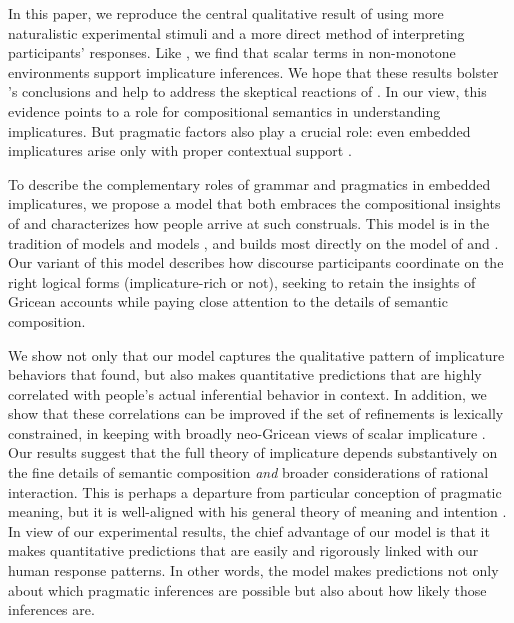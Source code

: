 \documentclass[leqno,12pt]{article}
\begin{document}
In this paper, we reproduce the central qualitative result of
\citet{Chemla:Spector:2011} using more naturalistic experimental
stimuli and a more direct method of interpreting participants'
responses. Like \citeauthor{Chemla:Spector:2011}, we find that scalar
terms in non-monotone environments support implicature inferences. We
hope that these results bolster \citeauthor{Chemla:Spector:2011}'s
conclusions and help to address the skeptical reactions of
\citet{geurts-vantiel:2013:scalar}. In our view, this evidence points
to a role for compositional semantics in understanding
implicatures. But pragmatic factors also play a crucial role: even
embedded implicatures arise only with proper contextual support
\citep{Russell06,ChierchiaFoxSpector08,Geurts:2011,Chemla:Spector:2011}.

To describe the complementary roles of grammar and pragmatics in
embedded implicatures, we propose a model that both embraces the
compositional insights of \citeauthor{ChierchiaFoxSpector08} and
characterizes how people arrive at such construals. This model is in
the tradition of  models
\citep{Frank:Goodman:2012,Goodman:Stuhlmuller:2013} and  models \citep{Franke09DISS,Jaeger:2011}, and builds
most directly on the  model of
\citet{Bergen:Goodman:Levy:2012} and
\citet{Bergen:Levy:Goodman:2014}. Our variant of this model describes
how discourse participants coordinate on the right logical forms
(implicature-rich or not), seeking to retain the insights of Gricean
accounts while paying close attention to the details of semantic
composition.

We show not only that our model captures the qualitative pattern of
implicature behaviors that \citeauthor{Chemla:Spector:2011} found, but
also makes quantitative predictions that are highly correlated with
people's actual inferential behavior in context. In addition, we show
that these correlations can be improved if the set of refinements is
lexically constrained, in keeping with broadly neo-Gricean views of
scalar implicature
\citep{Horn72,Gazdar79b,Gazdar79a,SchulzVanRooij06}.  Our results
suggest that the full theory of implicature depends substantively on
the fine details of semantic composition \emph{and} broader
considerations of rational interaction. This is perhaps a departure
from  particular conception of pragmatic meaning,
but it is well-aligned with his general theory of meaning and
intention \citep{grice57}.  In view of our experimental results, the
chief advantage of our model is that it makes quantitative predictions
that are easily and rigorously linked with our human response
patterns. In other words, the model makes predictions not only about
which pragmatic inferences are possible but also about how likely
those inferences are.
\end{document}
